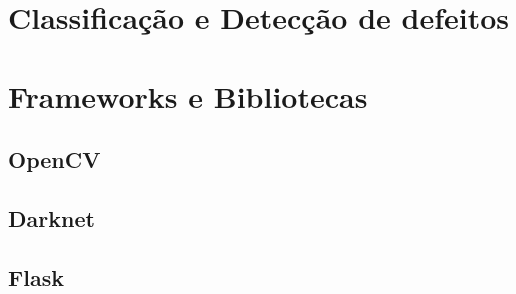 \section{Classificação e Detecção de defeitos} \label{cap:fund-frameworks}
\section{Frameworks e Bibliotecas} \label{cap:fund-frameworks}
\subsection{OpenCV} \label{cap:fund-frameworks-opencv}
\subsection{Darknet} \label{cap:fund-frameworks-darknet}
\subsection{Flask} \label{cap:fund-frameworks-flask}
